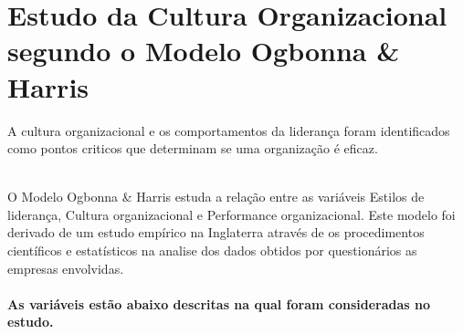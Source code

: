 {





\newpage
\section{Estudo da Cultura Organizacional segundo o Modelo Ogbonna \& Harris}
\qquad A cultura organizacional e os comportamentos da liderança foram identificados como pontos criticos que determinam se uma organização é eficaz.\\

\\
O Modelo Ogbonna \& Harris estuda a relação entre as variáveis Estilos de liderança, Cultura organizacional e Performance organizacional. Este modelo foi derivado de um estudo empírico na Inglaterra através de os procedimentos científicos e estatísticos na analise dos dados obtidos por questionários as empresas envolvidas.\\
\\
{\bf As variáveis estão abaixo descritas na qual foram consideradas no estudo.}\\
\\

}

